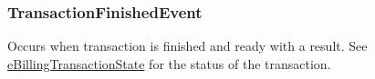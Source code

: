 \subsubsection[{Transaction\+Finished\+Event}]{ Transaction\+Finished\+Event\hspace{0.3cm}{\ttfamily [static]}}\label{class_voxel_busters_1_1_native_plugins_1_1_billing_ad59cc097e59a8605d00c8a0b9a1743cb}


Occurs when transaction is finished and ready with a result. See \hyperlink{namespace_voxel_busters_1_1_native_plugins_a1b545f54cd8f7e04410c379e01ff27f2}{e\+Billing\+Transaction\+State} for the status of the transaction. 

